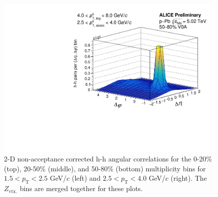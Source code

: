 \begin{figure}[ht]
\begin{minipage}{0.48\textwidth}
		\includegraphics[width=\textwidth]{figures/analysis/h_h_2d_nomixcor_fancy_label_50_80_highpt.pdf}
	\end{minipage}
	\caption{2-D non-acceptance corrected h-h angular correlations for the 0-20\% (top), 20-50\% (middle), and 50-80\% (bottom) multiplicity bins for $1.5 < p_{\text{T}} < 2.5$ GeV/$c$ (left) and $2.5 < p_{\text{T}} < 4.0$ GeV/$c$ (right). The $Z_{\text{vtx.}}$ bins are merged together for these plots.}
	\label{fig:h_h_2d_nomixcor}
\end{figure}

